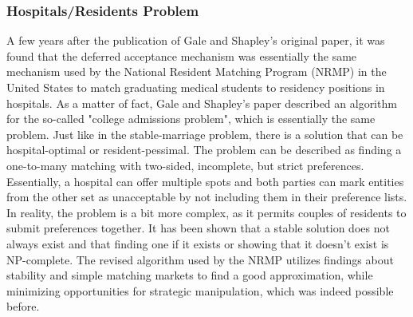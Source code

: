 \subsubsection{Hospitals/Residents Problem}
A few years after the publication of Gale and Shapley's original paper, it was found that the deferred acceptance mechanism was essentially the same mechanism used by the National Resident Matching Program (NRMP) in the United States to match graduating medical students to residency positions in hospitals.\cite{Gusfield} As a matter of fact, Gale and Shapley's paper described an algorithm for the so-called "college admissions problem"\cite{GaleShapleyOrig}, which is essentially the same problem. Just like in the stable-marriage problem, there is a solution that can be hospital-optimal or resident-pessimal. 
\newline
The problem can be described as finding a one-to-many matching with two-sided, incomplete, but strict preferences. Essentially, a hospital can offer multiple spots and both parties can mark entities from the other set as unacceptable by not including them in their preference lists.\cite{RePEc:ris:nobelp:2012_005} 
\newline
In reality, the problem is a bit more complex, as it permits couples of residents to submit preferences together. It has been shown that a stable solution does not always exist and that finding one if it exists or showing that it doesn't exist is NP-complete.\cite{RONN1990285} The revised algorithm used by the NRMP utilizes findings about stability and simple matching markets to find a good approximation, while minimizing opportunities for strategic manipulation, which was indeed possible before.\cite{NBERw6963}

